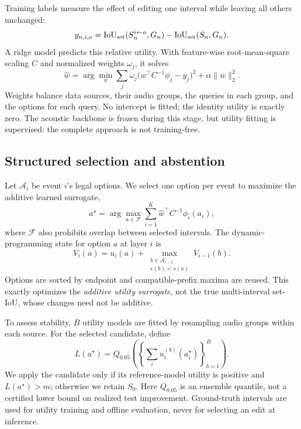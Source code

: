 Training labels measure the effect of editing one interval while leaving all others unchanged:
\begin{equation}
y_{n,i,a}=
\operatorname{IoU}_{\mathrm{set}}(S_n^{i\leftarrow a},G_n)
-\operatorname{IoU}_{\mathrm{set}}(S_n,G_n).
\label{eq:target}
\end{equation}
A ridge model predicts this relative utility. With feature-wise root-mean-square scaling $C$ and normalized weights $\omega_j$, it solves
\begin{equation}
\hat w=\arg\min_w
\sum_j\omega_j\big(w^\top C^{-1}\phi_j-y_j\big)^2
+\alpha\|w\|_2^2.
\label{eq:ridge}
\end{equation}
Weights balance data sources, their audio groups, the queries in each group, and the options for each query. No intercept is fitted; the identity utility is exactly zero. The acoustic backbone is frozen during this stage, but utility fitting is supervised: the complete approach is not training-free.

\subsection{Structured selection and abstention}
Let $\mathcal A_i$ be event $i$'s legal options. We select one option per event to maximize the additive learned surrogate,
\begin{equation}
a^\star=\arg\max_{a\in\mathcal F}
\sum_{i=1}^{K}\hat w^\top C^{-1}\phi_i(a_i),
\label{eq:select}
\end{equation}
where $\mathcal F$ also prohibits overlap between selected intervals. The dynamic-programming state for option $a$ at layer $i$ is
\begin{equation}
V_i(a)=u_i(a)+
\max_{\substack{b\in\mathcal A_{i-1}\\e(b)<s(a)}}V_{i-1}(b).
\label{eq:dp}
\end{equation}
Options are sorted by endpoint and compatible-prefix maxima are reused. This exactly optimizes the \emph{additive utility surrogate}, not the true multi-interval set-IoU, whose changes need not be additive.

To assess stability, $B$ utility models are fitted by resampling audio groups within each source. For the selected candidate, define
\begin{equation}
L(a^\star)=Q_{0.05}\!\left(
\left\{\sum_i u_i^{(b)}(a_i^\star)\right\}_{b=1}^{B}
\right).
\label{eq:quantile}
\end{equation}
We apply the candidate only if its reference-model utility is positive and $L(a^\star)>m$; otherwise we retain $S_0$. Here $Q_{0.05}$ is an ensemble quantile, not a certified lower bound on realized test improvement. Ground-truth intervals are used for utility training and offline evaluation, never for selecting an edit at inference.
